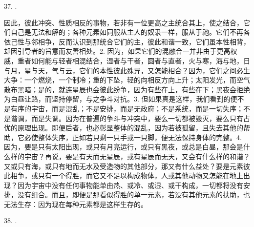 37. .\par

因此，彼此冲突、性质相反的事物，若非有一位更高之主统合其上，使之结合，它们自己是无法和解的；各种元素如同服从主人的奴隶一样，服从于祂。它们不再各依己性与邻相争，反而认识到那统合它们的主，彼此和谐一致，它们虽本性相背，却因引导者的旨意而友善相处。2. 因为，如果它们的混融合一并非由于更高权威，重者如何能与轻者相混结合，湿者与干者，圆者与直者，火与寒，海与地，日与月，星与天，气与云，它们的本性彼此殊异，又怎能相合？因为，它们之间必生大争：一个燃烧，一个制冷；重的下坠，轻的向相反方向上升；太阳发光，而空气散布黑暗；是的，就连星辰也会彼此纷争，因为有些在上，有些在下；黑夜会拒绝为白昼让路，而坚持停留，与之争斗对抗。3. 但如果真是这样，我们看到的便不是有序的宇宙，而是混乱；不是安排，而是无政府；不是系统，而是一切失序；不是谐调，而是失调。因为在普遍的争斗与冲突中，要么一切都被毁灭，要么只有占优的原理出现。即便后者，也必彰显整体的混乱，因为若被孤留，且失去其他的帮助，它必使整体失序，正如若只剩一只手或一只脚，便无法保持身体的完整。4. 因为，要是只有太阳出现，或只有月亮运行，或只有黑夜，或总是白昼，那会是什么样的宇宙？再说，要是有天而无星辰，或有星辰而无天，又会有什么样的和谐？又或只有海，或只有地而无水及受造物的其他部分，那又有什么益处？要是元素彼此相争，或只有一个得胜，而它又不足以构成物体，人或其他动物又怎能在地上出现？因为宇宙中没有任何事物能单由热、或冷、或湿、或干构成，一切都将没有安排，没有组合。而且，即便是那看似得胜的单一元素，若没有其他元素的扶助，也无法生存：因为现在每种元素都是这样生存的。\par

38. .\par

